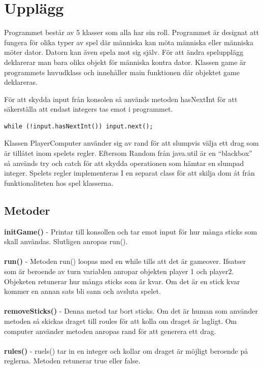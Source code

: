 \documentclass[hidelinks]{article}
\begin{document}
\section*{Upplägg}
Programmet består av 5 klasser som alla har sin roll. Programmet är designat att fungera för olika typer av spel där människa kan möta människa eller människa möter dator. Datorn kan även spela mot sig själv.
För att ändra spelupplägg deklarerar man bara olika objekt för människa kontra dator.
Klassen game är programmets huvudklass och innehåller main funktionen där objektet game deklareras.

För att skydda input från konsolen så används metoden hasNextInt för att säkerställa att endast integers tas emot i programmet.
\begin{verbatim}
while (!input.hasNextInt()) input.next();
\end{verbatim}

Klassen PlayerComputer använder sig av rand för att slumpvis välja ett drag som är tillåtet inom spelets regler. Eftersom Random från java.util är en “blackbox” så används try och catch för att skydda operationen som hämtar en slumpad integer.
Spelets regler implementeras I en separat class för att skilja dom åt från funktionaliteten hos spel klasserna.

\subsection*{Metoder}
\textbf{initGame()} - Printar till konsollen och tar emot input för hur många sticks som skall användas. Slutligen anropas run().\\ \\
\textbf{run()} - Metoden run() loopas med en while tills att det är gameover. Ifsatser som är beroende av turn variablen anropar objekten player 1 och player2. Objeketen retunerar hur många sticks som är kvar. Om det är en stick kvar kommer en annan sats bli sann och avsluta spelet. \\ \\
\textbf{removeSticks()} - Denna metod tar bort sticks. Om det är human som använder metoden så skickas draget till roules för att kolla om draget är lagligt. Om computer använder metoden anropas rand för att generera ett drag. \\ \\
\textbf{rules()} - ruels() tar in en integer och kollar om draget är möjligt beroende på reglerna. Metoden retunerar true eller false.
\end{document}
